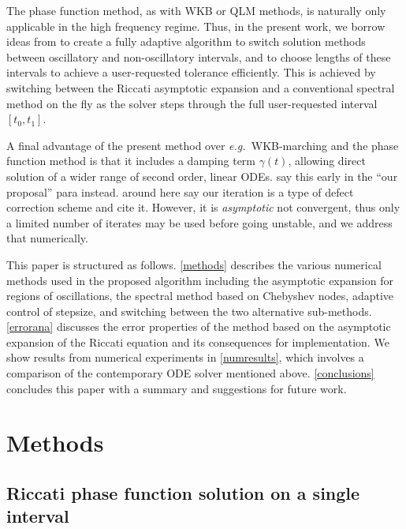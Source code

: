 \documentclass[10pt]{article}
\newcommand{\eg}{{\it e.g.\ }}
\newcommand{\om}{\omega}
\newcommand{\g}{\gamma}
\newcommand{\AB}[1]{{\color{orange}#1}}
\begin{document}
The phase function method, as with WKB or QLM methods,
is naturally only applicable in the high frequency regime.
Thus, in the present work, we borrow ideas from \cite{agocs2020efficient} to
create a fully adaptive algorithm to switch
solution methods between oscillatory and non-oscillatory intervals,
and to choose lengths of these intervals to achieve a user-requested
tolerance efficiently.
This is achieved by switching between the Riccati asymptotic expansion and a conventional
spectral method on the fly as the solver
steps through the full user-requested interval $[t_0, t_1]$.

%
A final advantage of the present method over \eg WKB-marching and the phase function method
is that it includes a damping term $\g(t)$, allowing direct solution of a wider
range of second order, linear ODEs.
\AB{say this early in the ``our proposal'' para instead.}
\AB{around here say our iteration is a type of defect correction scheme and cite it. However, it is {\em asymptotic} not convergent, thus only a limited number of iterates may be used before going unstable, and we address that numerically.}

This paper is structured as follows. \cref{methods} describes the various
numerical methods used in the proposed algorithm including the asymptotic
expansion for regions of oscillations, the spectral method based on Chebyshev
nodes, adaptive control of stepsize, and switching between the two alternative
sub-methods. \cref{errorana} discusses the error properties of the method based
on the asymptotic expansion of the Riccati equation and its consequences for
implementation. We show results from numerical experiments in
\cref{numresults}, which involves a comparison of the contemporary ODE solver
mentioned above. \cref{conclusions} concludes this paper with a summary and
suggestions for future work.


\section{Methods \label{methods}}

\subsection{Riccati phase function solution on a
  single interval \label{phasefun}}
\end{document}
